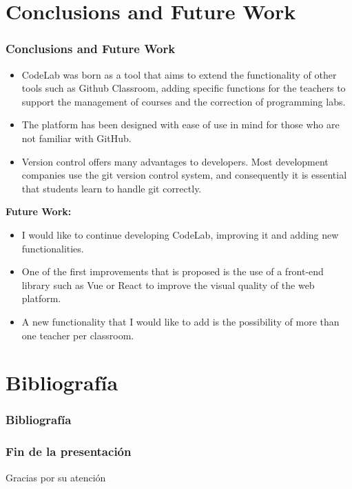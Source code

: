 \documentclass{beamer}
\begin{document}
\section{Conclusions and Future Work}
\begin{frame}[allowframebreaks]
  \frametitle{Conclusions and Future Work}

  \begin{itemize}
    \item CodeLab was born as a tool that aims to extend the functionality of other tools such as Github 
          Classroom, adding specific functions for the teachers to support the management of courses and 
          the correction of programming labs.
    \item The platform has been designed with ease of use in mind for those who are not familiar with GitHub.
    \item Version control offers many advantages to developers. Most development companies use the git 
          version control system, and consequently it is essential that students learn to handle git correctly.
  \end{itemize}
  \framebreak
  
  {\bf Future Work:}
  \begin{itemize}
    \item I would like to continue developing CodeLab, improving it and adding new functionalities. 
    \item One of the first improvements that is proposed is the use of a front-end library such as Vue 
          or React to improve the visual quality of the web platform.
    \item A new functionality that I would like to add is the possibility of more than one teacher per classroom.
  \end{itemize}
\end{frame}


\section{Bibliografía}
\begin{frame}[allowframebreaks]
  \frametitle{Bibliografía}
  
  
  \nocite{*}
\end{frame}

\begin{frame}
  \frametitle{Fin de la presentación}
  \begin{center}
    \Huge{Gracias por su atención}
  \end{center}
\end{frame}
\end{document}
